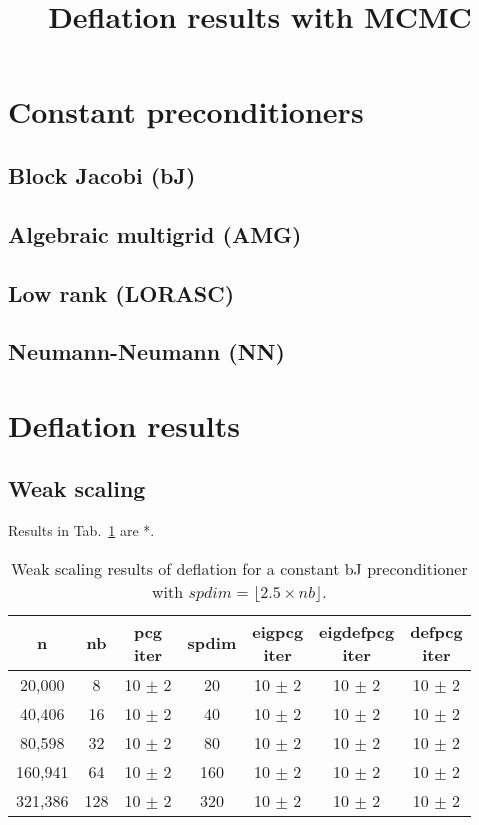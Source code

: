 \documentclass{article}
\title{Deflation results with MCMC}
\begin{document}
\maketitle

\section{Constant preconditioners}

\subsection{Block Jacobi (bJ)}

\subsection{Algebraic multigrid (AMG)}

\subsection{Low rank (LORASC)}


\subsection{Neumann-Neumann (NN)}

\section{Deflation results}

\subsection{Weak scaling}
Results in Tab.~\ref{Tab:005} are *.


\begin{table}[ht]
	\caption{Weak scaling results of deflation for a constant bJ preconditioner with $spdim=\lfloor 2.5 \times nb\rfloor$.}
	\centering
	\begin{tabular}{|c|c|c|c|c|c|c|}
		\hline
		n & nb & \makecell{pcg\\ iter} & spdim & \makecell{eigpcg\\ iter} & \makecell{eigdefpcg\\ iter} & \makecell{defpcg\\ iter}\\
		\hline
		20,000  &   8 & 10 $\pm$ 2 & 20 & 10 $\pm$ 2 & 10 $\pm$ 2 & 10 $\pm$ 2 \\
		40,406  &  16 & 10 $\pm$ 2 & 40 & 10 $\pm$ 2 & 10 $\pm$ 2 & 10 $\pm$ 2 \\
		80,598  &  32 & 10 $\pm$ 2 & 80 & 10 $\pm$ 2 & 10 $\pm$ 2 & 10 $\pm$ 2 \\
		160,941 &  64 & 10 $\pm$ 2 & 160 & 10 $\pm$ 2 & 10 $\pm$ 2 & 10 $\pm$ 2 \\
		321,386 & 128 & 10 $\pm$ 2 & 320 & 10 $\pm$ 2 & 10 $\pm$ 2 & 10 $\pm$ 2 \\
		\hline
	\end{tabular}
	\label{Tab:005}
\end{table}
\end{document}
